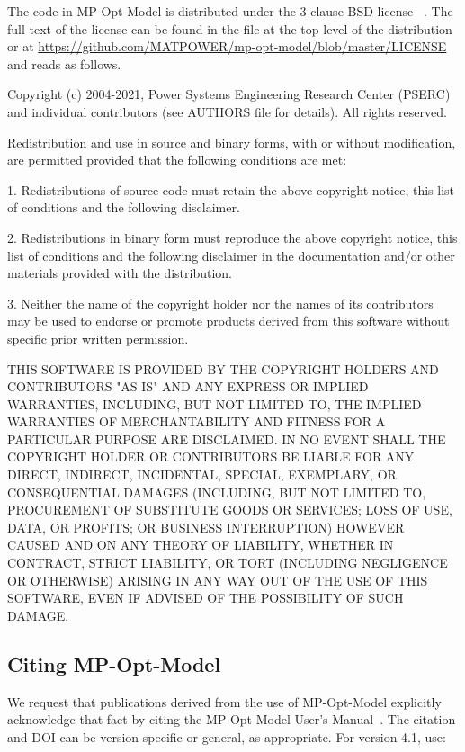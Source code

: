 \documentclass[12pt]{article}
\newcommand{\mpom}[0]{\mbox{MP-Opt-Model}}
\newcommand{\mpomname}[0]{\mpom{}}
\newcommand{\code}[1]{{\relsize{-0.5}{\tt{{#1}}}}}  %
\numberwithin{equation}{section}
\numberwithin{table}{section}
\numberwithin{figure}{section}
\begin{document}
The code in \mpom{} is distributed under the 3-clause BSD license
~\cite{bsd}. The full text of the license can be found in the \code{LICENSE} file at the top level of the distribution or at \url{https://github.com/MATPOWER/mp-opt-model/blob/master/LICENSE} and reads as follows.

\begin{Notice}
Copyright (c) 2004-2021, Power Systems Engineering Research Center
(PSERC) and individual contributors (see AUTHORS file for details).
All rights reserved.

Redistribution and use in source and binary forms, with or without
modification, are permitted provided that the following conditions
are met:

1. Redistributions of source code must retain the above copyright
notice, this list of conditions and the following disclaimer.

2. Redistributions in binary form must reproduce the above copyright
notice, this list of conditions and the following disclaimer in the
documentation and/or other materials provided with the distribution.

3. Neither the name of the copyright holder nor the names of its
contributors may be used to endorse or promote products derived from
this software without specific prior written permission.

THIS SOFTWARE IS PROVIDED BY THE COPYRIGHT HOLDERS AND CONTRIBUTORS
"AS IS" AND ANY EXPRESS OR IMPLIED WARRANTIES, INCLUDING, BUT NOT
LIMITED TO, THE IMPLIED WARRANTIES OF MERCHANTABILITY AND FITNESS
FOR A PARTICULAR PURPOSE ARE DISCLAIMED. IN NO EVENT SHALL THE
COPYRIGHT HOLDER OR CONTRIBUTORS BE LIABLE FOR ANY DIRECT, INDIRECT,
INCIDENTAL, SPECIAL, EXEMPLARY, OR CONSEQUENTIAL DAMAGES (INCLUDING,
BUT NOT LIMITED TO, PROCUREMENT OF SUBSTITUTE GOODS OR SERVICES;
LOSS OF USE, DATA, OR PROFITS; OR BUSINESS INTERRUPTION) HOWEVER
CAUSED AND ON ANY THEORY OF LIABILITY, WHETHER IN CONTRACT, STRICT
LIABILITY, OR TORT (INCLUDING NEGLIGENCE OR OTHERWISE) ARISING IN
ANY WAY OUT OF THE USE OF THIS SOFTWARE, EVEN IF ADVISED OF THE
POSSIBILITY OF SUCH DAMAGE.
\end{Notice}

\clearpage
\subsection{Citing \mpom{}}

We request that publications derived from the use of \mpom{} explicitly acknowledge that fact by citing the \mpomname{} User's Manual~\cite{mpom_manual}.
The citation and DOI can be version-specific or general, as appropriate. For version 4.1, use:
\end{document}
